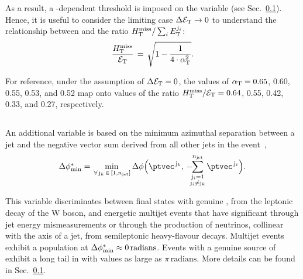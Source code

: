 As a result, a \scalht-dependent threshold is imposed on the \alphat
variable (see Sec.~\ref{}). Hence, it is useful to consider the
limiting case $\Delta\mathcal{E}_\mathrm{T} \rightarrow 0$ to understand the relationship
between \alphat and the ratio $\mbox{$H_{\rm T}^{\rm miss}$}/\sum_{i} E_\textrm{T}^{j_i}$: 
\begin{equation}
  \label{eq:alphat3}
  \frac{\mbox{$H_{\rm T}^{\rm miss}$}}{\mathcal{E}_\mathrm{T}} \, = \, \sqrt{ 1 - \frac{1}{4 \cdot \alpha_{\text{T}}^2} }.
\end{equation}

For reference, under the assumption of $\Delta\mathcal{E}_\mathrm{T} = 0$, the values of
$\alpha_{\text{T}} = 0.65$, 0.60, 0.55, 0.53, and 0.52 map onto values of the
ratio $\mbox{$H_{\rm T}^{\rm miss}$}/\mathcal{E}_\mathrm{T} = 0.64$, 0.55, 0.42, 0.33, and 0.27, respectively.

\subsection{\bdphi}

An additional variable is based on the minimum azimuthal separation
between a jet and the negative vector \ptvec sum derived from all
other jets in the event~\cite{RA1Paper},
\begin{equation}
  \bdphi = \min_{\,\forall\, \mathrm{j}_k\,\in\, [1,\njet]}
  \Delta\phi \Bigl( \ptvec^{\,\mathrm{j}_k}, \,
    -\hspace{-0.5em}\sum_{\substack{\mathrm{j}_i= 1 \\ \mathrm{j}_i \ne \mathrm{j}_k}}^{\njet}
    \ptvec^{\,\mathrm{j}_i} \Bigr).
  \label{eq:bdphi}
\end{equation}

This variable discriminates between final states with genuine
\ptvecmiss, \eg from the leptonic decay of the W boson, and energetic
multijet events that have significant \ptvecmiss through jet energy
mismeasurements or through the production of neutrinos, collinear with
the axis of a jet, from semileptonic heavy-flavour decays. Multijet
events exhibit a population at $\mbox{$\Delta\phi^{*}_{\rm min}$} \approx
0\,\mathrm{radians}$. Events with a genuine source of \ptvecmiss
exhibit a long tail in \bdphi with values as large as
$\pi\,\mathrm{radians}$. More details can be found in Sec.~\ref{}.

